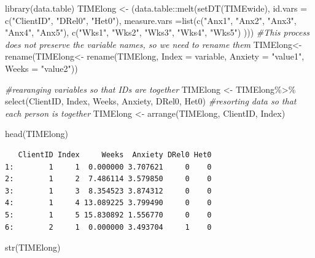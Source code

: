 \documentclass[
  english,
]{book}
\newenvironment{Shaded}{\begin{snugshade}}{\end{snugshade}}
\newcommand{\AttributeTok}[1]{\textcolor[rgb]{0.77,0.63,0.00}{#1}}
\newcommand{\CommentTok}[1]{\textcolor[rgb]{0.56,0.35,0.01}{\textit{#1}}}
\newcommand{\FunctionTok}[1]{\textcolor[rgb]{0.00,0.00,0.00}{#1}}
\newcommand{\NormalTok}[1]{#1}
\newcommand{\OtherTok}[1]{\textcolor[rgb]{0.56,0.35,0.01}{#1}}
\newcommand{\SpecialCharTok}[1]{\textcolor[rgb]{0.00,0.00,0.00}{#1}}
\newcommand{\StringTok}[1]{\textcolor[rgb]{0.31,0.60,0.02}{#1}}
\begin{document}
\begin{Shaded}
\begin{Highlighting}[]
\FunctionTok{library}\NormalTok{(data.table)}
\NormalTok{TIMElong }\OtherTok{\textless{}{-}}\NormalTok{ (data.table}\SpecialCharTok{::}\FunctionTok{melt}\NormalTok{(}\FunctionTok{setDT}\NormalTok{(TIMEwide), }\AttributeTok{id.vars =} \FunctionTok{c}\NormalTok{(}\StringTok{"ClientID"}\NormalTok{, }\StringTok{"DRel0"}\NormalTok{, }\StringTok{"Het0"}\NormalTok{), }\AttributeTok{measure.vars =}\FunctionTok{list}\NormalTok{(}\FunctionTok{c}\NormalTok{(}\StringTok{"Anx1"}\NormalTok{, }\StringTok{"Anx2"}\NormalTok{, }\StringTok{"Anx3"}\NormalTok{, }\StringTok{"Anx4"}\NormalTok{, }\StringTok{"Anx5"}\NormalTok{),  }\FunctionTok{c}\NormalTok{(}\StringTok{"Wks1"}\NormalTok{, }\StringTok{"Wks2"}\NormalTok{, }\StringTok{"Wks3"}\NormalTok{, }\StringTok{"Wks4"}\NormalTok{, }\StringTok{"Wks5"}\NormalTok{) )))}
\CommentTok{\#This process  does not preserve the variable names, so we need to rename them}
\NormalTok{TIMElong}\OtherTok{\textless{}{-}} \FunctionTok{rename}\NormalTok{(TIMElong}\OtherTok{\textless{}{-}}  \FunctionTok{rename}\NormalTok{(TIMElong, }\AttributeTok{Index =}\NormalTok{ variable, }\AttributeTok{Anxiety =} \StringTok{"value1"}\NormalTok{, }\AttributeTok{Weeks =} \StringTok{"value2"}\NormalTok{))}

\CommentTok{\#rearanging variables so that IDs are together}
\NormalTok{TIMElong }\OtherTok{\textless{}{-}}\NormalTok{ TIMElong}\SpecialCharTok{\%\textgreater{}\%}
  \FunctionTok{select}\NormalTok{(ClientID, Index, Weeks, Anxiety, DRel0, Het0)}
\CommentTok{\#resorting data so that each person is together}
\NormalTok{TIMElong }\OtherTok{\textless{}{-}} \FunctionTok{arrange}\NormalTok{(TIMElong, ClientID, Index)}

\FunctionTok{head}\NormalTok{(TIMElong)}
\end{Highlighting}
\end{Shaded}

\begin{verbatim}
   ClientID Index     Weeks  Anxiety DRel0 Het0
1:        1     1  0.000000 3.707621     0    0
2:        1     2  7.486114 3.579850     0    0
3:        1     3  8.354523 3.874312     0    0
4:        1     4 13.089225 3.799490     0    0
5:        1     5 15.830892 1.556770     0    0
6:        2     1  0.000000 3.493704     1    0
\end{verbatim}

\begin{Shaded}
\begin{Highlighting}[]
\FunctionTok{str}\NormalTok{(TIMElong)}
\end{Highlighting}
\end{Shaded}
\end{document}
